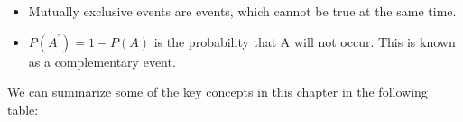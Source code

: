 \begin{itemize}[noitemsep]
      
      \label{m39373*uid4559}\nopagebreak\noindent{}
    
      

\item 
Mutually exclusive events are events, which cannot be true at the same
time.\item 
\begin{math}P\left({A}^{\text{'}}\right)=1-P\left(A\right)\end{math} is the probability that A will not occur. This is known as a
complementary event.\end{itemize}
        \label{m39373*eip-199}We can summarize some of the key concepts in this chapter in the following table:\par 
    
